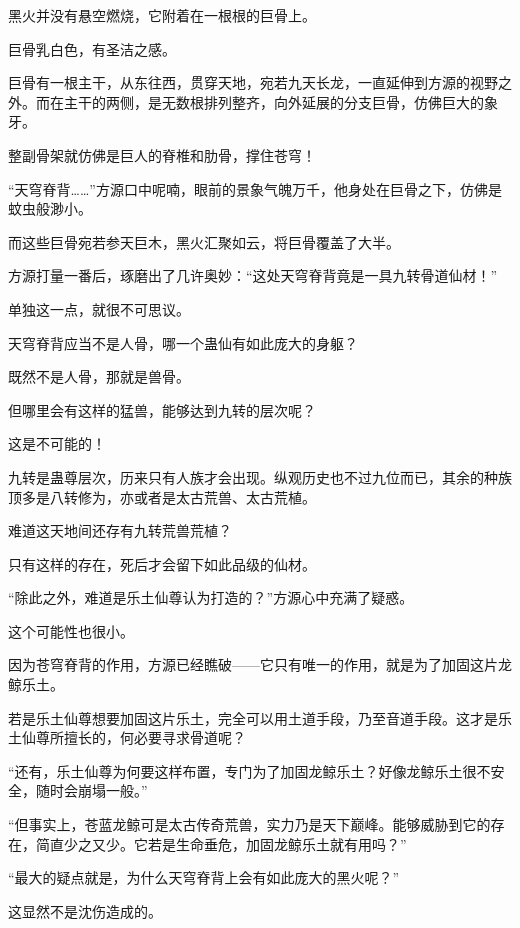 
\begin{this_body}



黑火并没有悬空燃烧，它附着在一根根的巨骨上。

巨骨乳白色，有圣洁之感。

巨骨有一根主干，从东往西，贯穿天地，宛若九天长龙，一直延伸到方源的视野之外。而在主干的两侧，是无数根排列整齐，向外延展的分支巨骨，仿佛巨大的象牙。

整副骨架就仿佛是巨人的脊椎和肋骨，撑住苍穹！

“天穹脊背……”方源口中呢喃，眼前的景象气魄万千，他身处在巨骨之下，仿佛是蚊虫般渺小。

而这些巨骨宛若参天巨木，黑火汇聚如云，将巨骨覆盖了大半。

方源打量一番后，琢磨出了几许奥妙：“这处天穹脊背竟是一具九转骨道仙材！”

单独这一点，就很不可思议。

天穹脊背应当不是人骨，哪一个蛊仙有如此庞大的身躯？

既然不是人骨，那就是兽骨。

但哪里会有这样的猛兽，能够达到九转的层次呢？

这是不可能的！

九转是蛊尊层次，历来只有人族才会出现。纵观历史也不过九位而已，其余的种族顶多是八转修为，亦或者是太古荒兽、太古荒植。

难道这天地间还存有九转荒兽荒植？

只有这样的存在，死后才会留下如此品级的仙材。

“除此之外，难道是乐土仙尊认为打造的？”方源心中充满了疑惑。

这个可能性也很小。

因为苍穹脊背的作用，方源已经瞧破——它只有唯一的作用，就是为了加固这片龙鲸乐土。

若是乐土仙尊想要加固这片乐土，完全可以用土道手段，乃至音道手段。这才是乐土仙尊所擅长的，何必要寻求骨道呢？

“还有，乐土仙尊为何要这样布置，专门为了加固龙鲸乐土？好像龙鲸乐土很不安全，随时会崩塌一般。”

“但事实上，苍蓝龙鲸可是太古传奇荒兽，实力乃是天下巅峰。能够威胁到它的存在，简直少之又少。它若是生命垂危，加固龙鲸乐土就有用吗？”

“最大的疑点就是，为什么天穹脊背上会有如此庞大的黑火呢？”

这显然不是沈伤造成的。


\end{this_body}
